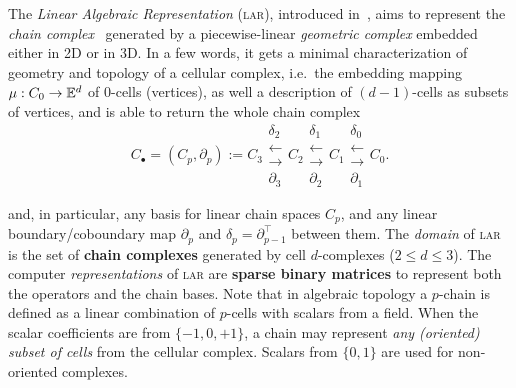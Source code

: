 The \emph{Linear Algebraic Representation} (\textsc{lar}), introduced in~\cite{Dicarlo:2014:TNL:2543138.2543294}, aims to represent the \emph{chain complex}~\cite{TSAS,DiCarlo2009} generated by a piecewise-linear \emph{geometric complex} embedded either in 2D or in 3D. In a few words, it gets a minimal characterization of geometry and topology of a cellular complex, i.e.~the embedding mapping $\mu : C_0 \to \mathbb{E}^d$ of 0-cells (vertices), as well a description of $(d-1)$-cells as subsets of vertices, and is able to return the whole chain complex 
\begin{equation}
C_\bullet = (C_p, \partial_p) := 
C_3 
\substack{
\delta_2 \\
\longleftarrow \\
\longrightarrow \\
\partial_3 
}
C_2 
\substack{
\delta_1 \\
\longleftarrow \\
\longrightarrow \\
\partial_2 
}
C_1  
\substack{
\delta_0 \\
\longleftarrow  \\
\longrightarrow \\
\partial_1 
}
C_0 .
\end{equation}






\noindent
and, in particular, any basis for linear chain spaces $C_p$, and any linear
boundary/coboundary map \(\partial_p\) and
\(\delta_p=\partial_{p-1}^\top\) between them. The \emph{domain} of \textsc{lar} is the set of \textbf{chain complexes} generated by cell $d$-complexes ($2\leq d\leq 3$). The computer \emph{representations} of \textsc{lar} are \textbf{sparse binary matrices} to represent both the operators and the chain bases. Note that in algebraic topology a $p$-chain is defined as a linear combination of $p$-cells with scalars from a field. When the scalar coefficients are from $\{-1, 0, +1\}$, a chain may represent \emph{any (oriented) subset of cells} from the cellular complex.
Scalars from $\{0, 1\}$ are used for non-oriented complexes.

